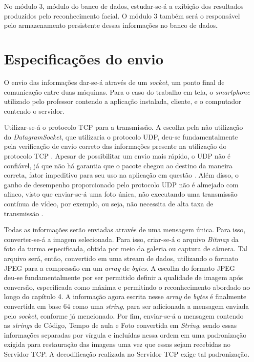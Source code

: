 No módulo 3, módulo do banco de dados, estudar-se-á a exibição dos resultados produzidos pelo reconhecimento facial. O módulo 3 também será o responsável pelo armazenamento persistente dessas informações no banco de dados.

\section{Especificações do envio}
O envio das informações dar-se-á através de um \textit{socket}, um ponto final de comunicação entre duas máquinas. Para o caso do trabalho em tela, o \textit{smartphone} utilizado pelo professor contendo a aplicação instalada, cliente, e o computador contendo o servidor. 

Utilizar-se-á o protocolo TCP para a transmissão. A escolha pela não utilização do \textit{DatagramSocket}, que utilizaria o protocolo UDP, deu-se fundamentalmente pela verificação de envio correto das informações presente na utilização do protocolo TCP \citep{Android10}. Apesar de possibilitar um envio mais rápido, o UDP não é confiável, já que não há garantia que o pacote chegou ao destino da maneira correta, fator impeditivo para seu uso na aplicação em questão \citep{Android9}. Além disso, o ganho de desempenho proporcionado pelo protocolo UDP não é almejado com afinco, visto que enviar-se-á uma foto única, não executando uma transmissão contínua de vídeo, por exemplo, ou seja, não necessita de alta taxa de transmissão \citep{Android9}.

Todas as informações serão enviadas através de uma mensagem única. Para isso, converter-se-á a imagem selecionada. Para isso, criar-se-á o arquivo \textit{Bitmap} da foto da turma especificada, obtida por meio da galeria ou captura de câmera. Tal arquivo será, então, convertido em uma stream de dados, utilizando o formato JPEG para a compressão em um \textit{array} de \textit{bytes}. A escolha do formato JPEG deu-se fundamentalmente por ser permitido definir a qualidade de imagem após conversão, especificada como máxima e permitindo o reconhecimento abordado ao longo do capítulo 4. A informação agora escrita nesse \textit{array} de \textit{bytes} é finalmente convertida em base 64 como uma \textit{string}, para ser adicionada a mensagem enviada pelo \textit{socket}, conforme já mencionado. Por fim, enviar-se-á a mensagem contendo as \textit{strings} de Código, Tempo de aula e Foto convertida em \textit{String}, sendo essas informações separadas por vírgula e incluídas nessa ordem em uma padronização exigida para restauração das imagens uma vez que essas sejam recebidas no Servidor TCP. A decodificação realizada no Servidor TCP exige tal padronização.

